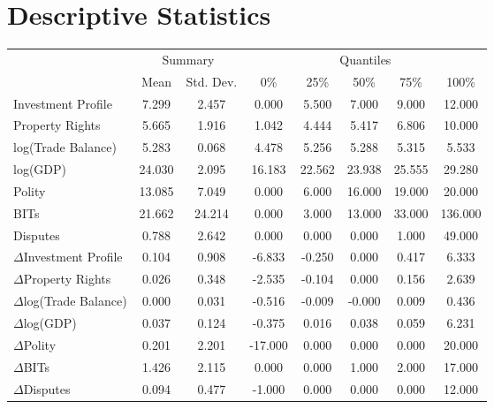 \section{Descriptive Statistics}

\begin{table}[ht]
\centering
\begin{tabular}{lcc|ccccc}
  \hline\hline
  & \multicolumn{2}{c}{Summary} & \multicolumn{5}{c}{Quantiles}\\
 & Mean & Std. Dev. & 0\% & 25\% & 50\% & 75\% & 100\% \\ 
  \hline
Investment Profile & 7.299 & 2.457 & 0.000 & 5.500 & 7.000 & 9.000 & 12.000 \\ 
  Property Rights & 5.665 & 1.916 & 1.042 & 4.444 & 5.417 & 6.806 & 10.000 \\ 
  \hline
  log(Trade Balance) & 5.283 & 0.068 & 4.478 & 5.256 & 5.288 & 5.315 & 5.533 \\ 
  log(GDP) & 24.030 & 2.095 & 16.183 & 22.562 & 23.938 & 25.555 & 29.280 \\ 
  Polity & 13.085 & 7.049 & 0.000 & 6.000 & 16.000 & 19.000 & 20.000 \\ 
  BITs & 21.662 & 24.214 & 0.000 & 3.000 & 13.000 & 33.000 & 136.000 \\ 
  Disputes & 0.788 & 2.642 & 0.000 & 0.000 & 0.000 & 1.000 & 49.000 \\ 
  \hline
  $\Delta$Investment Profile & 0.104 & 0.908 & -6.833 & -0.250 & 0.000 & 0.417 & 6.333 \\ 
  $\Delta$Property Rights & 0.026 & 0.348 & -2.535 & -0.104 & 0.000 & 0.156 & 2.639 \\ 
  $\Delta$log(Trade Balance) & 0.000 & 0.031 & -0.516 & -0.009 & -0.000 & 0.009 & 0.436 \\ 
  $\Delta$log(GDP) & 0.037 & 0.124 & -0.375 & 0.016 & 0.038 & 0.059 & 6.231 \\ 
  $\Delta$Polity & 0.201 & 2.201 & -17.000 & 0.000 & 0.000 & 0.000 & 20.000 \\ 
  $\Delta$BITs & 1.426 & 2.115 & 0.000 & 0.000 & 1.000 & 2.000 & 17.000 \\ 
  $\Delta$Disputes & 0.094 & 0.477 & -1.000 & 0.000 & 0.000 & 0.000 & 12.000 \\ 
   \hline\hline
\end{tabular}
\end{table}

\newpage

